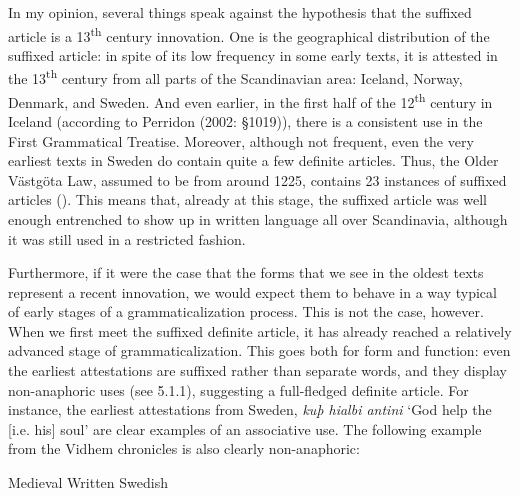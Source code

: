 \begin{styleBodytextC}
In my opinion, several things speak against the hypothesis that the suffixed article is a 13\textsuperscript{th} century innovation. One is the geographical distribution of the suffixed article: in spite of its low frequency in some early texts, it is attested in the 13\textsuperscript{th} century from all parts of the Scandinavian area: Iceland, Norway, Denmark, and Sweden.  And even earlier, in the first half of the 12\textsuperscript{th} century in Iceland (according to Perridon (2002: §1019)), there is a consistent use in the First Grammatical Treatise. Moreover, although not frequent, even the very earliest texts in Sweden do contain quite a few definite articles. Thus, the Older Västgöta Law, assumed to be from around 1225, contains 23 instances of suffixed articles (\citet[24]{Larm1936}). This means that, already at this stage, the suffixed article was well enough entrenched to show up in written language all over Scandinavia, although it was still used in a restricted fashion. 

\end{styleBodytextC}

\begin{styleBodytextC}
Furthermore, if it were the case that the forms that we see in the oldest texts represent a recent innovation, we would expect them to behave in a way typical of early stages of a grammaticalization process. This is not the case, however. When we first meet the suffixed definite article, it has already reached a relatively advanced stage of grammaticalization. This goes both for form and function: even the earliest attestations are suffixed rather than separate words, and they display non-anaphoric uses (see 5.1.1), suggesting a full-fledged definite article. For instance, the earliest attestations from Sweden, \textit{kuþ hialbi antini }‘God help the [i.e. his] soul’ are clear examples of an associative use. The following example from the Vidhem chronicles is also clearly non-anaphoric:

\end{styleBodytextC}

\begin{listWWNumileveli}
\item {}

\begin{styleExample}
Medieval Written Swedish 

\end{styleExample}

\end{listWWNumileveli}

